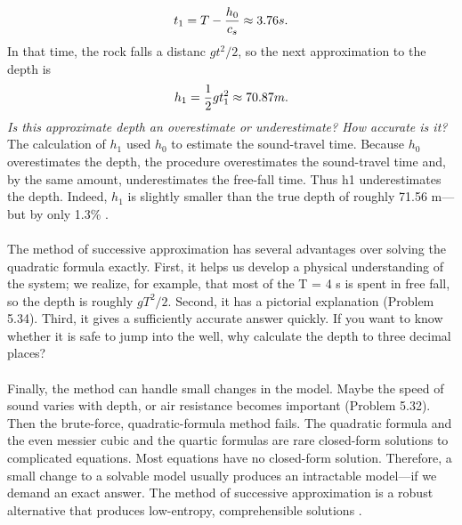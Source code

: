 \documentclass[fleqn]{book}
\newcounter{pro1}
\begin{document}
 
\pagestyle{fancy} 

\renewcommand{\headrulewidth}{0pt}
\fancyhf{} %

\Large
\begin{equation} 
\Large t_{1}=T-\frac{h_{0}}{c_{s}}\approx 3.76s.
\end{equation} 
\Large \textrm{In that time, the rock falls a distanc $gt^{2}/2$, so the next approximation to the depth is} 
\begin{equation}
\Large h_{1}=\frac{1}{2}gt_{1}^{2}\approx 70.87m.
\end{equation} 
 \large\textsl{Is this approximate depth an overestimate or underestimate? How accurate is it?} \\ 
\Large \textrm{The calculation of $h_{1}$ used $h_{0}$ to estimate the sound-travel time. Because 
$h_{0}$ overestimates the depth, the procedure overestimates the sound-travel 
time and, by the same amount, underestimates the free-fall time. Thus 
h1 underestimates the depth. Indeed, $h_{1}$ is slightly smaller than the true 
depth of roughly 71.56 m—but by only 1.3\% .} \\ 
\\
\Large\textrm{The method of successive approximation has several advantages over solving the quadratic formula exactly. First, it helps us develop a physical 
understanding of the system; we realize, for example, that most of the 
T = 4 s is spent in free fall, so the depth is roughly $gT^{2}/2$. Second, it 
has a pictorial explanation (Problem 5.34). Third, it gives a sufficiently 
accurate answer quickly. If you want to know whether it is safe to jump 
into the well, why calculate the depth to three decimal places?} \\ 
\\
\Large\textrm{Finally, the method can handle small changes in the model. Maybe the 
speed of sound varies with depth, or air resistance becomes important 
(Problem 5.32). Then the brute-force, quadratic-formula method fails. The 
quadratic formula and the even messier cubic and the quartic formulas 
are rare closed-form solutions to complicated equations. Most equations 
have no closed-form solution. Therefore, a small change to a solvable 
model usually produces an intractable model—if we demand an exact 
answer. The method of successive approximation is a robust alternative 
that produces low-entropy, comprehensible solutions .} \\ 
\end{document}
